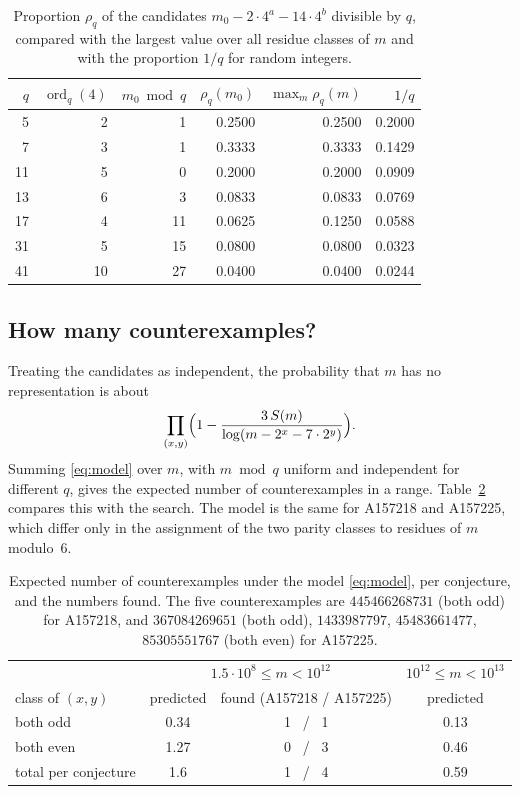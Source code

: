 \documentclass[11pt]{article}
\theoremstyle{definition}
\theoremstyle{remark}
\newcommand{\mz}{m_0}
\newcommand{\ord}{\operatorname{ord}}
\begin{document}
\begin{table}[t]
\centering
\begin{tabular}{rrrrrr}
\toprule
$q$ & $\ord_q(4)$ & $\mz \bmod q$ & $\rho_q(\mz)$ & $\max_m \rho_q(m)$ & $1/q$ \\
\midrule
5 & 2 & 1 & 0.2500 & 0.2500 & 0.2000 \\
7 & 3 & 1 & 0.3333 & 0.3333 & 0.1429 \\
11 & 5 & 0 & 0.2000 & 0.2000 & 0.0909 \\
13 & 6 & 3 & 0.0833 & 0.0833 & 0.0769 \\
17 & 4 & 11 & 0.0625 & 0.1250 & 0.0588 \\
31 & 5 & 15 & 0.0800 & 0.0800 & 0.0323 \\
41 & 10 & 27 & 0.0400 & 0.0400 & 0.0244 \\
\bottomrule
\end{tabular}
\caption{Proportion $\rho_q$ of the candidates $\mz-2\cdot 4^a-14\cdot 4^b$ divisible by $q$,
compared with the largest value over all residue classes of $m$ and with the proportion $1/q$ for
random integers.}\label{tab:local}
\end{table}

\subsection{How many counterexamples?}
Treating the candidates as independent, the probability that $m$ has no representation is about
\begin{equation}\label{eq:model}
  \prod_{(x,y)}\Bigl(1-\frac{3\,S(m)}{\log(m-2^x-7\cdot 2^y)}\Bigr).
\end{equation}
Summing \eqref{eq:model} over $m$, with $m \bmod q$ uniform and independent for different $q$,
gives the expected number of counterexamples in a range. Table~\ref{tab:pred} compares this with
the search. The model is the same for A157218 and A157225, which differ only in the assignment of
the two parity classes to residues of $m$ modulo~$6$.

\begin{table}[t]
\centering
\begin{tabular}{lccc}
\toprule
 & \multicolumn{2}{c}{$1.5\cdot 10^{8}\le m<10^{12}$} & $10^{12}\le m<10^{13}$\\
class of $(x,y)$ & predicted & found (A157218 / A157225) & predicted \\
\midrule
both odd & 0.34 & 1 \ / \ 1 & 0.13 \\
both even & 1.27 & 0 \ / \ 3 & 0.46 \\
\midrule
total per conjecture & 1.6 & 1 \ / \ 4 & 0.59 \\
\bottomrule
\end{tabular}
\caption{Expected number of counterexamples under the model \eqref{eq:model}, per conjecture,
and the numbers found. The five counterexamples are $445466268731$ (both odd) for A157218, and
$367084269651$ (both odd), $1433987797$, $45483661477$, $85305551767$ (both even) for A157225.}
\label{tab:pred}
\end{table}
\end{document}
